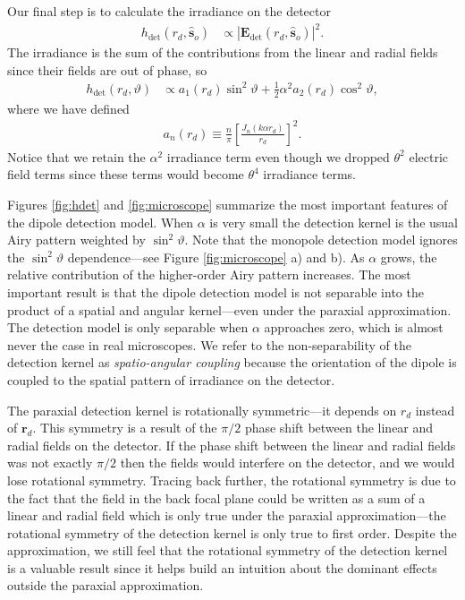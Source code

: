 \documentclass[]{osa-article}
\providecommand{\mb}[1]{\mathbf{#1}}
\providecommand{\so}{\mathbf{\hat{s}}_o}
\providecommand{\rd}{\mathbf{r}_d}
\begin{document}
Our final step is to calculate the irradiance on the detector
\begin{align}
  h_{\text{det}}(r_d, \so{}) &\propto |\mb{E}_{\text{det}}(r_d, \so{})|^2.
\end{align}
The irradiance is the sum of the contributions from the linear and radial fields
since their fields are out of phase, so
\begin{align}
  h_{\text{det}}(r_d, \vartheta) &\propto a_1(r_d)\sin^2\vartheta + \frac{1}{2}\alpha^2 a_2(r_d)\cos^2\vartheta, 
\end{align}
where we have defined
\begin{align}
  a_n(r_d) \equiv \frac{n}{\pi}\left[\frac{J_n(k\alpha r_d)}{r_d}\right]^2. 
\end{align}
Notice that we retain the $\alpha^2$ irradiance term even though we dropped
$\theta^2$ electric field terms since these terms would become $\theta^4$
irradiance terms.

Figures \ref{fig:hdet} and \ref{fig:microscope} summarize the most important
features of the dipole detection model. When $\alpha$ is very small the
detection kernel is the usual Airy pattern weighted by $\sin^2\vartheta$. Note
that the monopole detection model ignores the $\sin^2\vartheta$ dependence---see
Figure \ref{fig:microscope} a) and b). As $\alpha$ grows, the relative
contribution of the higher-order Airy pattern increases. The most important
result is that the dipole detection model is not separable into the product of a
spatial and angular kernel---even under the paraxial approximation. The
detection model is only separable when $\alpha$ approaches zero, which is almost
never the case in real microscopes. We refer to the non-separability of the
detection kernel as \textit{spatio-angular coupling} because the orientation of
the dipole is coupled to the spatial pattern of irradiance on the detector.

The paraxial detection kernel is rotationally symmetric---it depends on $r_d$ instead of
$\rd$. This symmetry is a result of the $\pi/2$ phase shift between the linear
and radial fields on the detector. If the phase shift between the linear and
radial fields was not exactly $\pi/2$ then the fields would interfere on the
detector, and we would lose rotational symmetry. Tracing back further, the
rotational symmetry is due to the fact that the field in the back focal plane
could be written as a sum of a linear and radial field which is only true under
the paraxial approximation---the rotational symmetry of the detection kernel is
only true to first order. Despite the approximation, we still feel that the
rotational symmetry of the detection kernel is a valuable result since it helps
build an intuition about the dominant effects outside the paraxial
approximation. 
\end{document}
